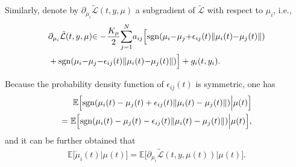 \documentclass[final,5p,times,twocolumn,authoryear]{elsarticle}
\newcommand{\sign}[1]{\mathrm{sgn}(#1)}
\begin{document}
	Similarly, denote by $ \partial_{\mu_i}\mathcal{\tilde{L}}(t,y,\mu)$ a subgradient of $\mathcal{\tilde{L}}$ with respect to $\mu_i$, i.e.,
	\begin{align}
		& \partial_{\mu_i}\mathcal{\tilde{L}}(t,y,\mu){\in}  -\! \frac{K_\mu}{2}\!\sum_{j=1}^N \! a_{ij}\Big[\sign{\mu_i{-}\mu_j {+} \epsilon_{ij}(t)\|\mu_i(t){-}\mu_j(t)\|}\notag\\
		& + \sign{\mu_i{-}\mu_j {-} \epsilon_{ij}(t)\|\mu_i(t){-}\mu_j(t)\|}\Big] + g_i(t,y_i).\label{lanmu}
	\end{align}
	
	Because the probability density function of $\epsilon_{ij}(t)$ is symmetric, one has
	\begin{align}
		\mathbb{E}\Big[\sign{\mu_i(t)-\mu_j(t)+\epsilon_{ij}(t)\|\mu_i(t)-\mu_j(t)\|}\Big|\mu(t)\Big]\notag\\
		=\mathbb{E}\Big[\sign{\mu_i(t)-\mu_j(t)-\epsilon_{ij}(t)\|\mu_i(t)-\mu_j(t)\|}\Big|\mu(t)\Big],\label{condi1}
	\end{align}
	and it can be further obtained that
	\begin{align}
		\mathbb{E}\Big[\dot{\mu}_i(t)\Big|\mu(t)\Big]=\mathbb{E}\Big[ \partial_{\mu_i}\mathcal{\tilde{L}}(t,y,\mu(t))\Big|\mu(t)\Big].
	\end{align}
	
\end{document}
